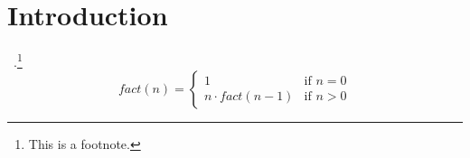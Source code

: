 \section{Introduction}\label{sec:introduction}

\lipsum[1]~\cite{Scribe25}.\footnote{This is a footnote.}
\begin{equation*}
    fact(n) = \begin{cases}
        1                 & \text{if } n = 0 \\
        n \cdot fact(n-1) & \text{if } n > 0
    \end{cases}
\end{equation*}
\lipsum[1]

\begin{center}
\end{center}

